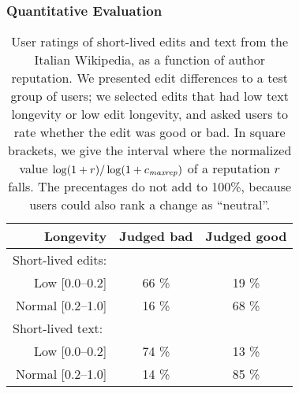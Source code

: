 \subsubsection*{Quantitative Evaluation}

\begin{table}
\begin{center}
\begin{tabular}{|r|c|c|} \hline
Longevity & Judged bad & Judged good \\ \hline
\multicolumn{1}{|l|}{Short-lived edits: \qquad \quad} & & \\[1ex]
   Low [0.0--0.2]   &    66  \% &    19 \% \\
Normal [0.2--1.0]   &    16  \% &    68 \% \\ \hline
\multicolumn{1}{|l|}{Short-lived text: \qquad \quad} & & \\[1ex]
   Low [0.0--0.2]   &    74  \% &    13 \% \\
Normal [0.2--1.0]   &    14  \% &    85 \% \\ \hline
\end{tabular}
\end{center}
\caption{User ratings of short-lived edits and text from the
  Italian Wikipedia, as a function of author reputation.
  We presented edit differences to a test group of users;
  we selected edits that had
  low text longevity or low edit longevity,
  and asked users to rate whether the edit was good or bad.
  In square brackets, we give the
  interval where the normalized value $\log(1+r) / \log (1 +
  {c_{{\text{\textit{maxrep}}}}})$ of a reputation $r$ falls.  The precentages do not
  add to 100\%, because users could also rank a change as ``neutral''.}
\label{tbl:human}
\end{table}

